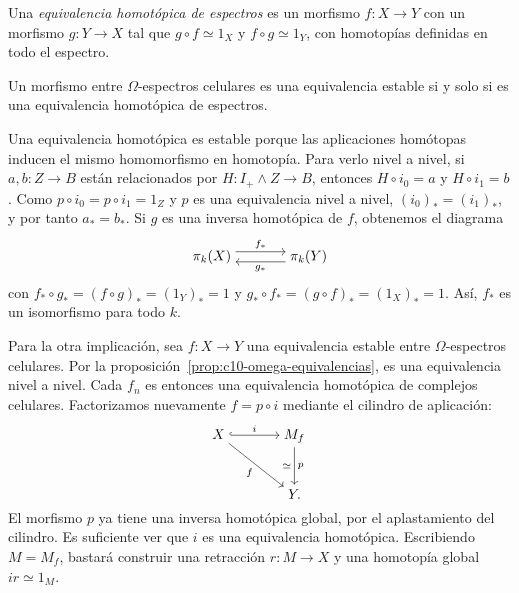 Una \emph{equivalencia homotópica de espectros} es un morfismo $f\colon X\to Y$ con un morfismo $g\colon Y\to X$ tal que $g\circ f\simeq1_X$ y $f\circ g\simeq1_Y$, con homotopías definidas en todo el espectro.

\begin{teo}[Whitehead]\label{teo:c12-whitehead}
Un morfismo entre $\Omega$-espectros celulares es una equivalencia estable si y solo si es una equivalencia homotópica de espectros.
\end{teo}

Una equivalencia homotópica es estable porque las aplicaciones homótopas inducen el mismo homomorfismo en homotopía. Para verlo nivel a nivel, si $a,b\colon Z\to B$ están relacionados por $H\colon I_+\wedge Z\to B$, entonces $H\circ i_0=a$ y $H\circ i_1=b$. Como $p\circ i_0=p\circ i_1=1_Z$ y $p$ es una equivalencia nivel a nivel, $(i_0)_*=(i_1)_*$, y por tanto $a_*=b_*$. Si $g$ es una inversa homotópica de $f$, obtenemos el diagrama
\[
\begin{tikzcd}[cramped,column sep=large]
\pi_k(X) \arrow[r,shift left=1.5,"f_*"]
& \pi_k(Y) \arrow[l,shift left=1.5,"g_*"]
\end{tikzcd}
\]
con $f_*\circ g_*=(f\circ g)_*=(1_Y)_*=1$ y $g_*\circ f_*=(g\circ f)_*=(1_X)_*=1$. Así, $f_*$ es un isomorfismo para todo $k$.

Para la otra implicación, sea $f\colon X\to Y$ una equivalencia estable entre $\Omega$-espectros celulares. Por la proposición~\ref{prop:c10-omega-equivalencias}, es una equivalencia nivel a nivel. Cada $f_n$ es entonces una equivalencia homotópica de complejos celulares. Factorizamos nuevamente $f=p\circ i$ mediante el cilindro de aplicación:
\[
\begin{tikzcd}[cramped,column sep=large,row sep=large]
X \arrow[r,hook,"i"] \arrow[dr,"f"']
& M_f \arrow[d,"p","\simeq"']\\
& Y.
\end{tikzcd}
\]
El morfismo $p$ ya tiene una inversa homotópica global, por el aplastamiento del cilindro. Es suficiente ver que $i$ es una equivalencia homotópica. Escribiendo $M=M_f$, bastará construir una retracción $r\colon M\to X$ y una homotopía global $ir\simeq1_M$.

